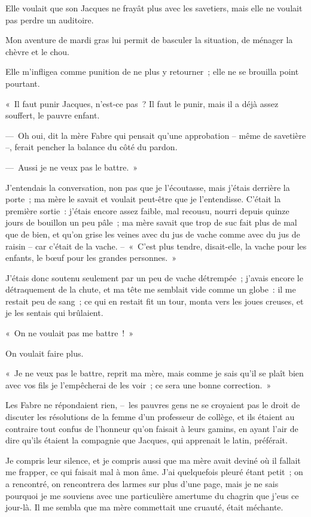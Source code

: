 \documentclass[french,twoside]{book} %
\begin{document}
Elle voulait que son Jacques ne frayât plus avec les savetiers, mais elle ne voulait pas perdre un auditoire.\par
Mon aventure de mardi gras lui permit de basculer la situation, de ménager la chèvre et le chou.\par
Elle m’infligea comme punition de ne plus y retourner ; elle ne se brouilla point pourtant.\par
« Il faut punir Jacques, n’est-ce pas ? Il faut le punir, mais il a déjà assez souffert, le pauvre enfant.\par
— Oh oui, dit la mère Fabre qui pensait qu’une approbation – même de savetière –, ferait pencher la balance du côté du pardon.\par
— Aussi je ne veux pas le battre. »\par
J’entendais la conversation, non pas que je l’écoutasse, mais j’étais derrière la porte ; ma mère le savait et voulait peut-être que je l’entendisse. C’était la première sortie : j’étais encore assez faible, mal recousu, nourri depuis quinze jours de bouillon un peu pâle ; ma mère savait que trop de suc fait plus de mal que de bien, et qu’on grise les veines avec du jus de vache comme avec du jus de raisin – car c’était de la vache. – « C’est plus tendre, disait-elle, la vache pour les enfants, le bœuf pour les grandes personnes. »\par
J’étais donc soutenu seulement par un peu de vache détrempée ; j’avais encore le détraquement de la chute, et ma tête me semblait vide comme un globe : il me restait peu de sang ; ce qui en restait fit un tour, monta vers les joues creuses, et je les sentais qui brûlaient.\par
« On ne voulait pas me battre ! »\par
On voulait faire plus.\par
« Je ne veux pas le battre, reprit ma mère, mais comme je sais qu’il se plaît bien avec vos fils je l’empêcherai de les voir ; ce sera une bonne correction. »\par
Les Fabre ne répondaient rien, – les pauvres gens ne se croyaient pas le droit de discuter les résolutions de la femme d’un professeur de collège, et ils étaient au contraire tout confus de l’honneur qu’on faisait à leurs gamins, en ayant l’air de dire qu’ils étaient la compagnie que Jacques, qui apprenait le latin, préférait.\par
Je compris leur silence, et je compris aussi que ma mère avait deviné où il fallait me frapper, ce qui faisait mal à mon âme. J’ai quelquefois pleuré étant petit ; on a rencontré, on rencontrera des larmes sur plus d’une page, mais je ne sais pourquoi je me souviens avec une particulière amertume du chagrin que j’eus ce jour-là. Il me sembla que ma mère commettait une cruauté, était méchante.\par
\end{document}
